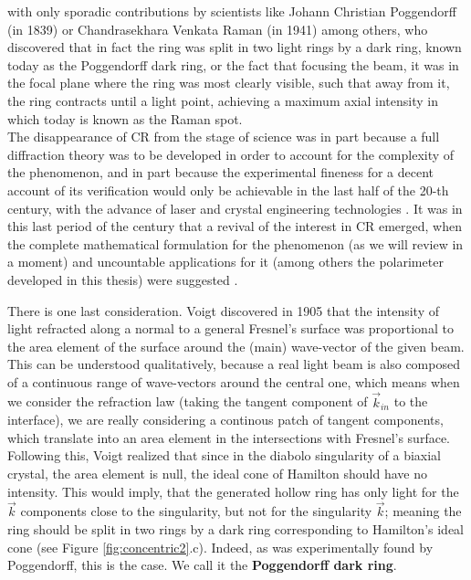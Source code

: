 \documentclass[11pt, a4paper, twoside]{article} %
\DeclareRobustCommand{\mybox}[2][gray!10]{%
\begin{tcolorbox}[   %
        left=0.2cm,
        right=0.2cm,
        top=0.15cm,
        bottom=0.15cm,
        colback=#1,
        colframe=#1,
        width=\dimexpr\textwidth\relax, 
        enlarge left by=0mm,
        boxsep=5pt,
        arc=0pt,outer arc=0pt,
        ]
        #2
\end{tcolorbox}
}
\begin{document}
\mybox{  with only sporadic contributions by scientists like Johann Christian Poggendorff (in 1839) \cite{poggendorff} or Chandrasekhara Venkata Raman (in 1941) \cite{raman1,raman2} among others, who discovered that in fact the ring was split in two light rings by a dark ring, known today as the Poggendorff dark ring, or the fact that focusing the beam, it was in the focal plane where the ring was most clearly visible, such that away from it, the ring contracts until a light point, achieving a maximum axial intensity in which today is known as the Raman spot.\\ 

The disappearance of CR from the stage of science was in part because a full diffraction theory was to be developed in order to account for the complexity of the phenomenon, and in part because the experimental fineness for a decent account of its verification would only be achievable in the last half of the 20-th century, with the advance of laser and crystal engineering technologies \cite{Todor}. It was in this last period of the century that a revival of the interest in CR emerged, when the complete mathematical formulation for the phenomenon \cite{BK1, BK2, Berry, Jeffrey} (as we will review in a moment) and uncountable applications for it \cite{Turpin} (among others the polarimeter developed in this thesis) were suggested \cite{Stokes1, Stokes2, incomplete}.
}

There is one last consideration. Voigt discovered in 1905 \cite{voigt, Jeffrey} that the intensity of light refracted along a normal to a general Fresnel's surface was proportional to the area element of the surface around the (main) wave-vector of the given beam. This can be understood qualitatively, because a real light beam is also composed of a continuous range of wave-vectors around the central one, which means when we consider the refraction law (taking the tangent component of $\vec{k}_{in}$ to the interface), we are really considering a continous patch of tangent components, which translate into an area element in the intersections with Fresnel's surface. Following this, Voigt realized that since in the diabolo singularity of a biaxial crystal, the area element is null, the ideal cone of Hamilton should have no intensity. This would imply, that the generated hollow ring has only light for the $\vec{k}$ components close to the singularity, but not for the singularity $\vec{k}$; meaning the ring should be split in two rings by a dark ring corresponding to Hamilton's ideal cone (see Figure \ref{fig:concentric2}.c). Indeed, as was experimentally found by Poggendorff, this is the case. We call it the {\bf Poggendorff dark ring}.
\end{document}
